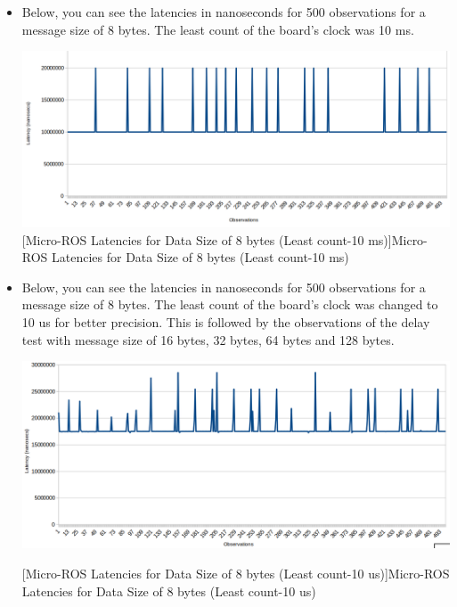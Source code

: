 \documentclass[%
xelatex,
	oneside,		%
	12pt,			%
	parskip=half,	%
	abstracton,
	chapterprefix=true%
    appendixprefix=true]
{scrbook}
\begin{document}
\begin{itemize}
\item Below, you can see the latencies in nanoseconds for 500 observations for a message size of 8 bytes. The least count of the board's clock was 10 ms.

\begin{center}
\includegraphics[scale=0.3]{fig/uros8byteles.png}
[Micro-ROS Latencies for Data Size of 8 bytes (Least count-10 ms)]{Micro-ROS Latencies for Data Size of 8 bytes (Least count-10 ms)}
\label{fig:uros8byteles}
\end{center}

\item Below, you can see the latencies in nanoseconds for 500 observations for a message size of 8 bytes. The least count of the board's clock was changed to 10 us for better precision. This is followed by the observations of the delay test with message size of 16 bytes, 32 bytes, 64 bytes and 128 bytes.
\begin{center}
\includegraphics[scale=0.32]{fig/uros8byte.png}

[Micro-ROS Latencies for Data Size of 8 bytes (Least count-10 us)]{Micro-ROS Latencies for Data Size of 8 bytes (Least count-10 us)}
\label{fig:uros8byte}
\end{center}



\end{itemize}
\end{document}
